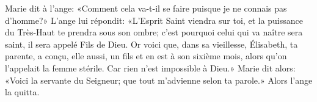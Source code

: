 Marie dit à l’ange:
	«Comment cela va-t-il se faire puisque je ne connais pas d’homme?»
L’ange lui répondit: «L’Esprit Saint viendra sur toi,
	et la puissance du Très-Haut te prendra sous son ombre;
	c’est pourquoi celui qui va naître sera saint, il sera appelé Fils de Dieu.
Or voici que, dans sa vieillesse, Élisabeth, ta parente, a conçu, elle aussi, un fils
	et en est à son sixième mois, alors qu’on l’appelait la femme stérile.
	Car rien n’est impossible à Dieu.»
Marie dit alors: «Voici la servante du Seigneur;
	que tout m’advienne selon ta parole.»
Alors l’ange la quitta.
